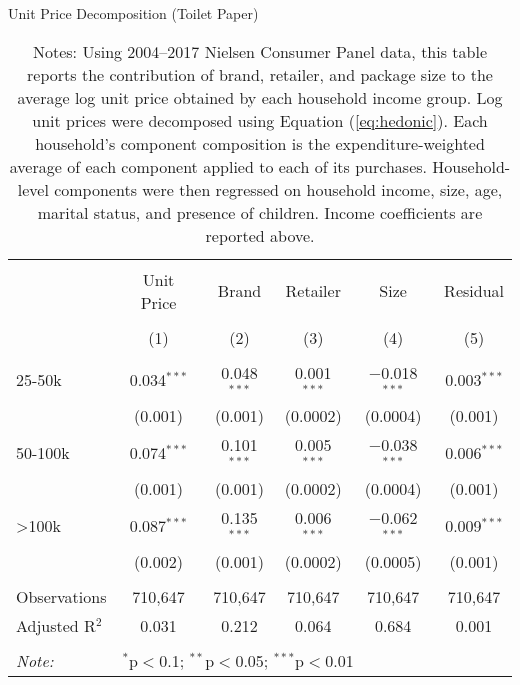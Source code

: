 \begin{table}[!htbp] \centering
  \caption{Unit Price Decomposition (Toilet Paper)}
  \label{tab:tpPriceDecomp}
\begin{tabular}{@{\extracolsep{5pt}}lccccc}
\\[-1.8ex]\hline
\hline \\[-1.8ex]
 & Unit Price & Brand & Retailer & Size & Residual \\
\\[-1.8ex] & (1) & (2) & (3) & (4) & (5)\\
\hline \\[-1.8ex]
 25-50k & 0.034$^{***}$ & 0.048$^{***}$ & 0.001$^{***}$ & $-$0.018$^{***}$ & 0.003$^{***}$ \\
  & (0.001) & (0.001) & (0.0002) & (0.0004) & (0.001) \\
  50-100k & 0.074$^{***}$ & 0.101$^{***}$ & 0.005$^{***}$ & $-$0.038$^{***}$ & 0.006$^{***}$ \\
  & (0.001) & (0.001) & (0.0002) & (0.0004) & (0.001) \\
  >100k & 0.087$^{***}$ & 0.135$^{***}$ & 0.006$^{***}$ & $-$0.062$^{***}$ & 0.009$^{***}$ \\
  & (0.002) & (0.001) & (0.0002) & (0.0005) & (0.001) \\
 \hline \\[-1.8ex]
Observations & 710,647 & 710,647 & 710,647 & 710,647 & 710,647 \\
Adjusted R$^{2}$ & 0.031 & 0.212 & 0.064 & 0.684 & 0.001 \\
\hline
\hline \\[-1.8ex]
\textit{Note:}  & \multicolumn{5}{l}{$^{*}$p$<$0.1; $^{**}$p$<$0.05; $^{***}$p$<$0.01} \\
\end{tabular}
\caption*{Notes: Using 2004--2017 Nielsen Consumer Panel data, this table reports the contribution of brand, retailer, and package size to the average log unit price obtained by each household income group. Log unit prices were decomposed using Equation (\ref{eq:hedonic}). Each household's component composition is the expenditure-weighted average of each component applied to each of its purchases. Household-level components were then regressed on household income, size, age, marital status, and presence of children. Income coefficients are reported above.}
\end{table}
